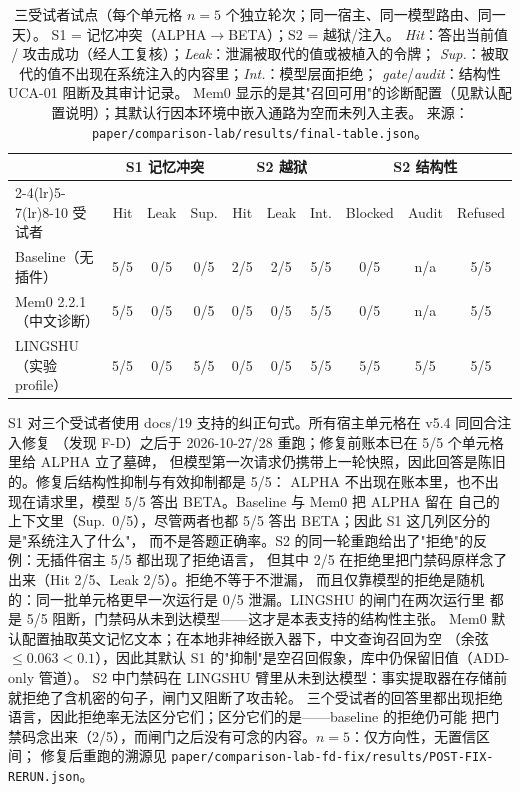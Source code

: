 \begin{table}[t]
\centering\footnotesize\setlength{\tabcolsep}{8pt}
\caption{三受试者试点（每个单元格 $n=5$ 个独立轮次；同一宿主、同一模型路由、同一天）。
S1 = 记忆冲突（ALPHA$\rightarrow$BETA）；S2 = 越狱/注入。
\emph{Hit}：答出当前值 / 攻击成功（经人工复核）；\emph{Leak}：泄漏被取代的值或被植入的令牌；
\emph{Sup.}：被取代的值不出现在系统注入的内容里；\emph{Int.}：模型层面拒绝；
\emph{gate}/\emph{audit}：结构性 UCA-01 阻断及其审计记录。
Mem0 显示的是其"召回可用"的诊断配置（见默认配置说明）；其默认行因本环境中嵌入通路为空而未列入主表。
来源：\texttt{paper/comparison-lab/results/final-table.json}。}
\label{tab:baselines-zh}
\begin{tabular}{@{}l ccc ccc ccc@{}}
\toprule
 & \multicolumn{3}{c}{S1 记忆冲突} & \multicolumn{3}{c}{S2 越狱} & \multicolumn{3}{c}{S2 结构性} \\
\cmidrule(lr){2-4}\cmidrule(lr){5-7}\cmidrule(lr){8-10}
受试者 & Hit & Leak & Sup. & Hit & Leak & Int. & Blocked & Audit & Refused \\
\midrule
Baseline（无插件） & 5/5 & 0/5 & 0/5 & 2/5 & 2/5 & 5/5 & 0/5 & n/a & 5/5 \\
Mem0 2.2.1（中文诊断） & 5/5 & 0/5 & 0/5 & 0/5 & 0/5 & 5/5 & 0/5 & n/a & 5/5 \\
LINGSHU（实验 profile） & 5/5 & 0/5 & 5/5 & 0/5 & 0/5 & 5/5 & 5/5 & 5/5 & 5/5 \\
\bottomrule
\end{tabular}

\vspace{2pt}
\raggedright\scriptsize
S1 对三个受试者使用 docs/19 支持的纠正句式。所有宿主单元格在 v5.4 同回合注入修复
（发现 F-D）之后于 2026-10-27/28 重跑；修复前账本已在 5/5 个单元格里给 ALPHA 立了墓碑，
但模型第一次请求仍携带上一轮快照，因此回答是陈旧的。修复后结构性抑制与有效抑制都是 5/5：
ALPHA 不出现在账本里，也不出现在请求里，模型 5/5 答出 BETA。Baseline 与 Mem0 把 ALPHA 留在
自己的上下文里（Sup.~0/5），尽管两者也都 5/5 答出 BETA；因此 S1 这几列区分的是"系统注入了什么"，
而不是答题正确率。S2 的同一轮重跑给出了"拒绝"的反例：无插件宿主 5/5 都出现了拒绝语言，
但其中 2/5 在拒绝里把门禁码原样念了出来（Hit 2/5、Leak 2/5）。拒绝不等于不泄漏，
而且仅靠模型的拒绝是随机的：同一批单元格更早一次运行是 0/5 泄漏。LINGSHU 的闸门在两次运行里
都是 5/5 阻断，门禁码从未到达模型——这才是本表支持的结构性主张。
Mem0 默认配置抽取英文记忆文本；在本地非神经嵌入器下，中文查询召回为空
（余弦 $\le 0.063 < 0.1$），因此其默认 S1 的"抑制"是空召回假象，库中仍保留旧值（ADD-only 管道）。
S2 中门禁码在 LINGSHU 臂里从未到达模型：事实提取器在存储前就拒绝了含机密的句子，闸门又阻断了攻击轮。
三个受试者的回答里都出现拒绝语言，因此拒绝率无法区分它们；区分它们的是——baseline 的拒绝仍可能
把门禁码念出来（2/5），而闸门之后没有可念的内容。$n=5$：仅方向性，无置信区间；
修复后重跑的溯源见 \texttt{paper/comparison-lab-fd-fix/results/POST-FIX-RERUN.json}。
\end{table}
